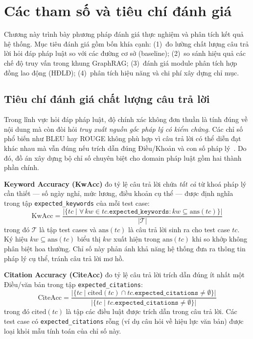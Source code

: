 \documentclass[../DoAn.tex]{subfiles}
\begin{document}
\section{Các tham số và tiêu chí đánh giá}
\label{section:4.1}

Chương này trình bày phương pháp đánh giá thực nghiệm và phân tích kết quả hệ thống. Mục tiêu đánh giá gồm bốn khía cạnh: (1)~đo lường chất lượng câu trả lời hỏi đáp pháp luật so với các đường cơ sở (baseline); (2)~so sánh hiệu quả các chế độ truy vấn trong khung GraphRAG; (3)~đánh giá module phân tích hợp đồng lao động (HĐLĐ); (4)~phân tích hiệu năng và chi phí xây dựng chỉ mục.

\subsection{Tiêu chí đánh giá chất lượng câu trả lời}
\label{subsection:4.1.1}

Trong lĩnh vực hỏi đáp pháp luật, độ chính xác không đơn thuần là tính đúng về nội dung mà còn đòi hỏi \emph{truy xuất nguồn gốc pháp lý có kiểm chứng}. Các chỉ số phổ biến như BLEU hay ROUGE không phù hợp vì câu trả lời có thể diễn đạt khác nhau mà vẫn đúng nếu trích dẫn đúng Điều/Khoản và con số pháp lý~\cite{das2026claimraglaw}. Do đó, đồ án xây dựng bộ chỉ số chuyên biệt cho domain pháp luật gồm hai thành phần chính.

\textbf{Keyword Accuracy (KwAcc)} đo tỷ lệ câu trả lời chứa \emph{tất cả} từ khoá pháp lý cần thiết — số ngày nghỉ, mức lương, điều khoản cụ thể — được định nghĩa trong tập \texttt{expected\_keywords} của mỗi test case:
\[
\mathrm{KwAcc} = \frac{\bigl|\bigl\{tc \;\big|\; \forall\, kw \in tc.\mathtt{expected\_keywords}: kw \subseteq \mathrm{ans}(tc)\bigr\}\bigr|}{|\mathcal{T}|}
\]
trong đó $\mathcal{T}$ là tập test cases và $\mathrm{ans}(tc)$ là câu trả lời sinh ra cho test case $tc$. Ký hiệu $kw \subseteq \mathrm{ans}(tc)$ biểu thị $kw$ xuất hiện trong $\mathrm{ans}(tc)$ khi so khớp không phân biệt hoa thường. Chỉ số này phản ánh khả năng hệ thống đưa ra thông tin pháp lý cụ thể, tránh câu trả lời mơ hồ.

\textbf{Citation Accuracy (CiteAcc)} đo tỷ lệ câu trả lời trích dẫn đúng ít nhất một Điều/văn bản trong tập \texttt{expected\_citations}:
\[
\mathrm{CiteAcc} = \frac{\bigl|\bigl\{tc \;\big|\; \mathrm{cited}(tc) \cap tc.\mathtt{expected\_citations} \neq \emptyset\bigr\}\bigr|}{\bigl|\bigl\{tc \;\big|\; tc.\mathtt{expected\_citations} \neq \emptyset\bigr\}\bigr|}
\]
trong đó $\mathrm{cited}(tc)$ là tập các điều luật được trích dẫn trong câu trả lời. Các test case có \texttt{expected\_citations} rỗng (ví dụ câu hỏi về hiệu lực văn bản) được loại khỏi mẫu tính toán của chỉ số này.
\end{document}
